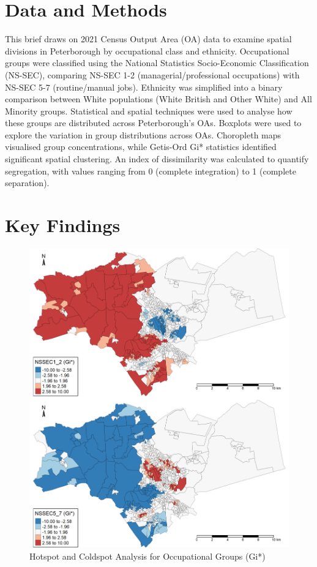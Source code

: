 \documentclass[10pt]{article}
\begin{document}
\begin{multicols}{2}
	\vspace{0em}
		
	\section*{Data and Methods}
	\indent This brief draws on 2021 Census Output Area (OA) data to examine spatial divisions in Peterborough by occupational class and ethnicity. Occupational groups were classified using the National Statistics Socio-Economic Classification (NS-SEC), comparing NS-SEC 1-2 (managerial/professional occupations) with NS-SEC 5-7 (routine/manual jobs). Ethnicity was simplified into a binary comparison between White populations (White British and Other White) and All Minority groups. Statistical and spatial techniques were used to analyse how these groups are distributed across Peterborough’s OAs. Boxplots were used to explore the variation in group distributions across OAs. Choropleth maps visualised group concentrations, while Getis-Ord Gi* statistics identified significant spatial clustering. An index of dissimilarity was calculated to quantify segregation, with values ranging from 0 (complete integration) to 1 (complete separation). 
	
	\vspace{-1em}
	
	\section*{Key Findings}
	
	\begin{figure}[H]
		\centering
		\includegraphics[width=0.8\linewidth]{occupation_gi.png}
		\caption{Hotspot and Coldspot Analysis for Occupational Groups (Gi*)}
		\label{fig:occupation_gi}
	\end{figure}


\end{multicols}
\end{document}
